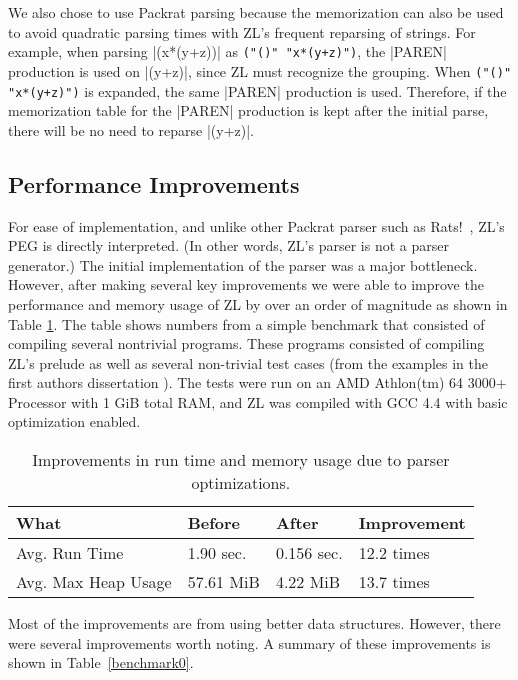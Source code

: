 We also chose to use Packrat parsing because the memorization can also
be used to avoid quadratic parsing times with ZL's frequent reparsing
of strings.  For example, when parsing |(x*(y+z))| as
\verb|("()" "x*(y+z)")|, the |PAREN| production is used on |(y+z)|,
since ZL must recognize the grouping.  When \verb|("()" "x*(y+z)")| is
expanded, the same |PAREN| production is used.  Therefore, if the
memorization table for the |PAREN| production is kept after the initial
parse, there will be no need to reparse |(y+z)|.

\subsection{Performance Improvements}

For ease of implementation, and unlike other Packrat parser such as
Rats!~\cite{peg-grimm}, ZL's PEG is directly interpreted.  (In other
words, ZL's parser is not a parser generator.)  The initial
implementation of the parser was a major bottleneck.  However, after
making several key improvements we were able to improve the
performance and memory usage of ZL by over an order of magnitude as
shown in Table \ref{benchmark}.  The table shows numbers from a simple
benchmark that consisted of compiling several nontrivial programs.
These programs consisted of compiling ZL's prelude as well as several
non-trivial test cases (from the examples in the first authors
dissertation \cite{abi-diss}). The tests were
run on an AMD Athlon(tm) 64 3000+ Processor with 1 GiB total RAM, and
ZL was compiled with GCC 4.4 with basic optimization enabled.

\begin{table}
\UndefineShortVerb{\|}
\begin{center}
\begin{tabular}{|l||l|l||l|}
\hline
What & Before & After & Improvement \\
\hline
\hline
Avg. Run Time & 1.90 sec. & 0.156 sec. & 12.2 times \\
\hline
Avg. Max Heap Usage & 57.61 MiB & 4.22 MiB & 13.7 times \\
\hline
\end{tabular}
\end{center}
\DefineShortVerb{\|}
\caption{Improvements in run time and memory usage due to parser optimizations.}
\label{benchmark}
\end{table}

Most of the improvements are from using better data structures.
However, there were several improvements worth noting.  A summary of
these improvements is shown in Table~\ref{benchmark0}.

